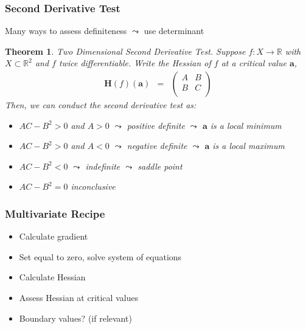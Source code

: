 \documentclass{beamer}
\newtheorem{thm}{Theorem}
\numberwithin{equation}{section}
\begin{document}
\begin{frame}
\frametitle{Second Derivative Test} 

Many ways to assess definiteness $\leadsto$ use determinant \pause

\begin{thm} 
Two Dimensional Second Derivative Test.  Suppose $f:X \rightarrow \mathbb{R}$ with $X \subset \mathbb{R}^{2}$ and $f$ twice differentiable.  Write the Hessian of $f$ at a critical value $\boldsymbol{a}$, 
\begin{eqnarray}
\boldsymbol{H}(f)(\boldsymbol{a}) & = & \begin{pmatrix} 
	A & B \\
	B & C \\
	\end{pmatrix} \nonumber 
	\end{eqnarray}
Then, we can conduct the second derivative test as:
\begin{itemize}
\item[-] $AC - B^2> 0$ and $A>0$ $\leadsto$ positive definite $\leadsto$ $\boldsymbol{a}$ is a local minimum 
\item[-] $AC - B^2> 0 $ and $A<0$ $\leadsto$ negative definite $\leadsto$ $\boldsymbol{a}$ is a local maximum
\item[-] $AC - B^2<0 $ $\leadsto$ indefinite $\leadsto$ saddle point 
\item[-] $AC- B^2 = 0$ inconclusive
\end{itemize}
	
\end{thm}

\end{frame}



\begin{frame}
\frametitle{Multivariate Recipe}

\begin{itemize}
\item[1)] Calculate gradient \pause
\item[2)] Set equal to zero, solve system of equations \pause
\item[3)] Calculate Hessian \pause
\item[4)] Assess Hessian at critical values \pause
\item[5)] Boundary values?  (if relevant)
\end{itemize}

\end{frame}
\end{document}

